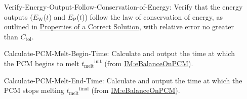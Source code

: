 \documentclass[12pt]{article}
\begin{document}
\begin{itemize}
\item[Verify-Energy-Output-Follow-Conservation-of-Energy:\phantomsection\label{verifyEnergyOutput}]{Verify that the energy outputs (${E_{\text{W}}}$($t$) and ${E_{\text{P}}}$($t$)) follow the law of conservation of energy, as outlined in \hyperref[Sec:CorSolProps]{Properties of a Correct Solution}, with relative error no greater than ${C_{\text{tol}}}$.}
\item[Calculate-PCM-Melt-Begin-Time:\phantomsection\label{calcPCMMeltBegin}]{Calculate and output the time at which the PCM begins to melt ${{t_{\text{melt}}}^{\text{init}}}$ (from \hyperref[IM:eBalanceOnPCM]{IM:eBalanceOnPCM}).}
\item[Calculate-PCM-Melt-End-Time:\phantomsection\label{calcPCMMeltEnd}]{Calculate and output the time at which the PCM stops melting ${{t_{\text{melt}}}^{\text{final}}}$ (from \hyperref[IM:eBalanceOnPCM]{IM:eBalanceOnPCM}).}
\end{itemize}
\end{document}
